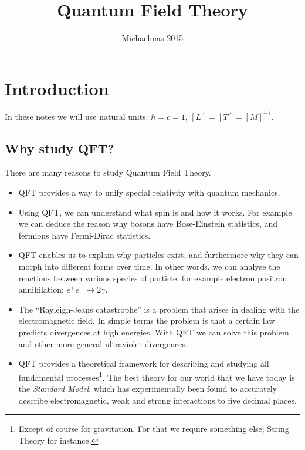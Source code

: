 \documentclass{jknotes} %
\begin{document}
\title{Quantum Field Theory}
\date{Michaelmas 2015}

\maketitle
\suggestionsspiel

\tableofcontents

\section{Introduction}
In these notes we will use natural units: \(\hbar = c = 1\), \([L]=[T]=[M]^{-1}\).

\subsection{Why study QFT?}

There are many reasons to study Quantum Field Theory.
\begin{itemize}
    \item QFT provides a way to unify special relativity with quantum mechanics.
    \item Using QFT, we can understand what spin is and how it works. For example we can deduce the reason why bosons have Bose-Einstein statistics, and fermions have Fermi-Dirac statistics.
    \item QFT enables us to explain why particles exist, and furthermore why they can morph into different forms over time. In other words, we can analyse the reactions between various species of particle, for example electron positron annihilation: \(e^+e^-\rightarrow2\gamma\).
    \item The ``Rayleigh-Jeans catastrophe'' is a problem that arises in dealing with the electromagnetic field. In simple terms the problem is that a certain law predicts divergences at high energies. With QFT we can solve this problem and other more general ultraviolet divergences.
    \item QFT provides a theoretical framework for describing and studying all fundamental processes\footnote{Except of course for gravitation. For that we require something else; String Theory for instance.}. The best theory for our world that we have today is the \emph{Standard Model}, which has experimentally been found to accurately describe electromagnetic, weak and strong interactions to five decimal places.
\end{itemize}
\end{document}

